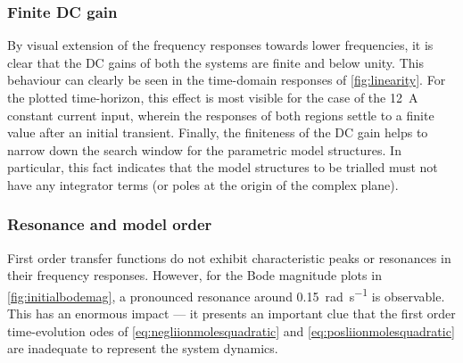 \subsubsection*{Finite DC gain}
By visual  extension of  the frequency responses  towards lower  frequencies, it
is  clear  that  the  DC  gains  of  both  the  systems  are  finite  and  below
unity.  This  behaviour  can  clearly  be  seen  in  the  time-domain  responses
of \cref{fig:linearity}.  For  the plotted  time-horizon,  this  effect is  most
visible for the case of the \SI{12}{\ampere} constant current input, wherein the
responses of both regions settle to a finite value after an initial transient.
Finally, the finiteness  of the DC gain  helps to narrow down  the search window
for the parametric model structures. In particular, this fact indicates that the
model structures to be trialled must not  have any integrator terms (or poles at
the origin of the complex plane).



\subsubsection*{Resonance and model order}

First  order  transfer   functions  do  not  exhibit   characteristic  peaks  or
resonances  in  their  frequency  responses.  However,  for  the  Bode
magnitude plots  in \cref{fig:initialbodemag},   a   pronounced   resonance   around
\SI{0.15}{\radian\per\second} is observable. This has  an enormous impact --- it
presents  an important  clue  that the  first  order time-evolution  \glspl{ode}
of \cref{eq:negliionmolesquadratic}   and \cref{eq:posliionmolesquadratic}   are
inadequate to represent the system dynamics.

